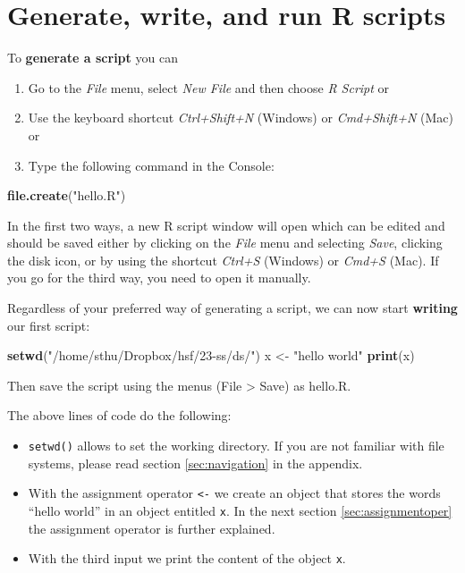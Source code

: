 \documentclass[
  12pt,
  oneside]{book}
\newenvironment{Shaded}{\begin{snugshade}}{\end{snugshade}}
\newcommand{\FunctionTok}[1]{\textcolor[rgb]{0.13,0.29,0.53}{\textbf{#1}}}
\newcommand{\NormalTok}[1]{#1}
\newcommand{\OtherTok}[1]{\textcolor[rgb]{0.56,0.35,0.01}{#1}}
\newcommand{\StringTok}[1]{\textcolor[rgb]{0.31,0.60,0.02}{#1}}
\providecommand{\tightlist}{%
  \setlength{\itemsep}{0pt}\setlength{\parskip}{0pt}}
\begin{document}
\hypertarget{generate-write-and-run-r-scripts}{%
\section{Generate, write, and run R scripts}\label{generate-write-and-run-r-scripts}}

To \textbf{generate a script} you can

\begin{enumerate}
\def\labelenumi{\arabic{enumi}.}
\tightlist
\item
  Go to the \emph{File} menu, select \emph{New File} and then choose \emph{R Script} or
\item
  Use the keyboard shortcut \emph{Ctrl+Shift+N} (Windows) or \emph{Cmd+Shift+N} (Mac) or
\item
  Type the following command in the Console:
\end{enumerate}

\begin{Shaded}
\begin{Highlighting}[]
\FunctionTok{file.create}\NormalTok{(}\StringTok{"hello.R"}\NormalTok{)}
\end{Highlighting}
\end{Shaded}

In the first two ways, a new R script window will open which can be edited and should be saved either by clicking on the \emph{File} menu and selecting \emph{Save}, clicking the disk icon, or by using the shortcut \emph{Ctrl+S} (Windows) or \emph{Cmd+S} (Mac).
If you go for the third way, you need to open it manually.

Regardless of your preferred way of generating a script, we can now start \textbf{writing} our first script:

\begin{Shaded}
\begin{Highlighting}[]
\FunctionTok{setwd}\NormalTok{(}\StringTok{"/home/sthu/Dropbox/hsf/23{-}ss/ds/"}\NormalTok{)}
\NormalTok{x }\OtherTok{\textless{}{-}} \StringTok{"hello world"}
\FunctionTok{print}\NormalTok{(x)}
\end{Highlighting}
\end{Shaded}

Then save the script using the menus (File \textgreater{} Save) as hello.R.

The above lines of code do the following:

\begin{itemize}
\tightlist
\item
  \texttt{setwd()} allows to set the working directory. If you are not familiar with file systems, please read section \ref{sec:navigation} in the appendix.
\item
  With the assignment operator \texttt{\textless{}-} we create an object that stores the words ``hello world'' in an object entitled \texttt{x}. In the next section \ref{sec:assignmentoper} the assignment operator is further explained.
\item
  With the third input we print the content of the object \texttt{x}.
\end{itemize}
\end{document}
